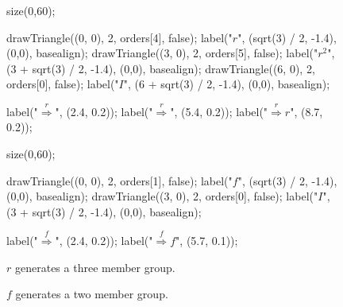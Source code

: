\documentclass[../textbook.tex]{subfiles}
\begin{document}
\begin{figure}[h]
	\begin{center}
		\begin{minipage}[b]{0.45\textwidth}
			\centering
			\begin{asy}[width=\textwidth]
				size(0,60);

				drawTriangle((0, 0), 2, orders[4], false);
				label("$r$", (sqrt(3) / 2, -1.4), (0,0), basealign);
				drawTriangle((3, 0), 2, orders[5], false);
				label("$r^2$", (3 + sqrt(3) / 2, -1.4), (0,0), basealign);
				drawTriangle((6, 0), 2, orders[0], false);
				label("$I$", (6 + sqrt(3) / 2, -1.4), (0,0), basealign);

				label("$\stackrel{r}{\Longrightarrow}$", (2.4, 0.2));
				label("$\stackrel{r}{\Longrightarrow}$", (5.4, 0.2));
				label("$\stackrel{r}{\Longrightarrow}r$", (8.7, 0.2));
			\end{asy}
		\end{minipage}
		\hfill
		\begin{minipage}[b]{0.45\textwidth}
			\centering
			\begin{asy}[width=0.7\textwidth]
				size(0,60);

				drawTriangle((0, 0), 2, orders[1], false);
				label("$f$", (sqrt(3) / 2, -1.4), (0,0), basealign);
				drawTriangle((3, 0), 2, orders[0], false);
				label("$I$", (3 + sqrt(3) / 2, -1.4), (0,0), basealign);

				label("$\stackrel{f}{\Longrightarrow}$", (2.4, 0.2));
				label("$\stackrel{f}{\Longrightarrow}f$", (5.7, 0.1));
			\end{asy}
		\end{minipage}
	\end{center}
	\vspace*{-2\baselineskip}
	\begin{center}
		\begin{minipage}[t]{0.45\textwidth}
			\caption{${r}$ generates a three member group.}
			\label{fig:successive_rotations}
		\end{minipage}
		\hfill
		\begin{minipage}[t]{0.45\textwidth}
			\caption{${f}$ generates a two member group.}
			\label{fig:flips}
		\end{minipage}
	\end{center}
\end{figure}
\end{document}
